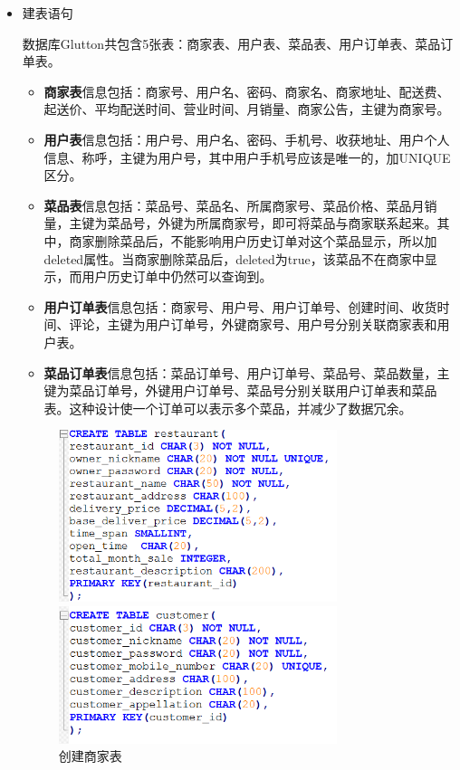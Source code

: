 \documentclass[12pt, oneside,a4paper]{article}
\begin{document}
\begin{itemize}
 \item 建表语句
 \par\setlength{\parindent}{1em}\normalsize 数据库Glutton共包含5张表：商家表、用户表、菜品表、用户订单表、菜品订单表。
 \begin{itemize}
 \item \textbf{商家表}信息包括：商家号、用户名、密码、商家名、商家地址、配送费、起送价、平均配送时间、营业时间、月销量、商家公告，主键为商家号。
 \item \textbf{用户表}信息包括：用户号、用户名、密码、手机号、收获地址、用户个人信息、称呼，主键为用户号，其中用户手机号应该是唯一的，加UNIQUE区分。
 \item \textbf{菜品表}信息包括：菜品号、菜品名、所属商家号、菜品价格、菜品月销量，主键为菜品号，外键为所属商家号，即可将菜品与商家联系起来。其中，商家删除菜品后，不能影响用户历史订单对这个菜品显示，所以加deleted属性。当商家删除菜品后，deleted为true，该菜品不在商家中显示，而用户历史订单中仍然可以查询到。
 \item \textbf{用户订单表}信息包括：商家号、用户号、用户订单号、创建时间、收货时间、评论，主键为用户订单号，外键商家号、用户号分别关联商家表和用户表。
 \item \textbf{菜品订单表}信息包括：菜品订单号、用户订单号、菜品号、菜品数量，主键为菜品订单号，外键用户订单号、菜品号分别关联用户订单表和菜品表。这种设计使一个订单可以表示多个菜品，并减少了数据冗余。
 \end{itemize}
  \begin{figure}[H]
   \begin{minipage}[t]{0.5\linewidth}
    \centering
     \includegraphics[width=3.2in]{table1.png}
     \caption{\small{创建商家表}}\label{fig:dummy}
   \end{minipage}
   \begin{minipage}[t]{0.5\linewidth}
    \centering
     \includegraphics[width=3.2in]{table2.png}

\end{minipage}
\end{figure}
\end{itemize}
\end{document}
